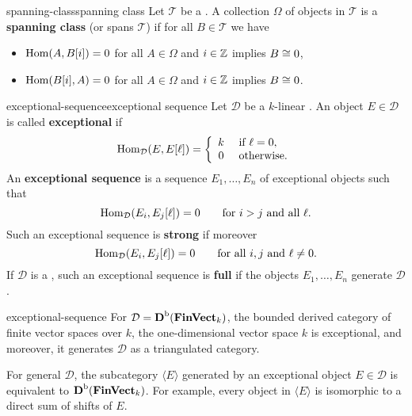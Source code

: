 \begin{topic}{spanning-class}{spanning class}
    Let $\mathcal{T}$ be a . A collection $\Omega$ of objects in $\mathcal{T}$ is a \textbf{spanning class} (or spans $\mathcal{T}$) if for all $B \in \mathcal{T}$ we have
    \begin{itemize}
        \item $\operatorname{Hom}(A, B[i]) = 0$ for all $A \in \Omega$ and $i \in \mathbb{Z}$ implies $B \cong 0$,
        \item $\operatorname{Hom}(B[i], A) = 0$ for all $A \in \Omega$ and $i \in \mathbb{Z}$ implies $B \cong 0$.
    \end{itemize}
\end{topic}

\begin{topic}{exceptional-sequence}{exceptional sequence}
    Let $\mathcal{D}$ be a $k$-linear . An object $E \in \mathcal{D}$ is called \textbf{exceptional} if
    \[ \operatorname{Hom}_\mathcal{D}(E, E[\ell]) = \left\{\begin{array}{cl} k & \text{ if } \ell = 0, \\ 0 & \text{ otherwise.} \end{array}\right. \]
    An \textbf{exceptional sequence} is a sequence $E_1, \ldots, E_n$ of exceptional objects such that
    \[ \operatorname{Hom}_\mathcal{D}(E_i, E_j[\ell]) = 0 \qquad \textup{for $i > j$ and all $\ell$}. \]
    Such an exceptional sequence is \textbf{strong} if moreover
    \[ \operatorname{Hom}_\mathcal{D}(E_i, E_j[\ell]) = 0 \qquad \textup{for all $i, j$ and $\ell \ne 0$}. \]
    If $\mathcal{D}$ is a , such an exceptional sequence is \textbf{full} if the objects $E_1, \ldots, E_n$ generate $\mathcal{D}$.
\end{topic}


\begin{example}{exceptional-sequence}
    For $\mathcal{D} = \textbf{D}^\textup{b}(\textbf{FinVect}_k)$, the bounded derived category of finite vector spaces over $k$, the one-dimensional vector space $k$ is exceptional, and moreover, it generates $\mathcal{D}$ as a triangulated category.

    For general $\mathcal{D}$, the subcategory $\langle E \rangle$ generated by an exceptional object $E \in \mathcal{D}$ is equivalent to $\textbf{D}^\textup{b}(\textbf{FinVect}_k)$. For example, every object in $\langle E \rangle$ is isomorphic to a direct sum of shifts of $E$.
\end{example}

